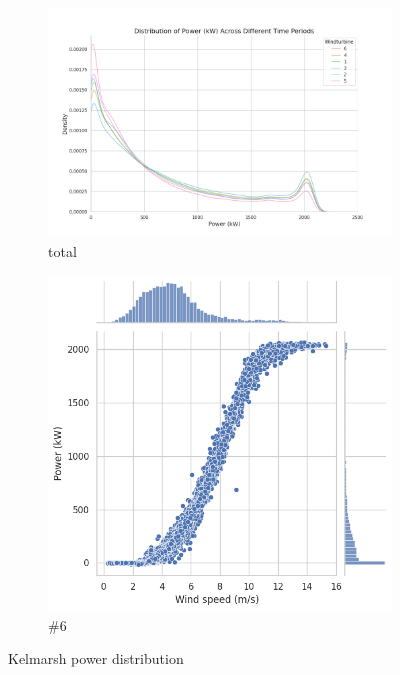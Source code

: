 \documentclass{article}
\begin{document}
\begin{figure}[h!]
    \centering
    \begin{subfigure}[b]{0.45\linewidth}
        \centering
        \includegraphics[width=\linewidth]{graphs/Kelmarsh_output_distribution.png}
        \caption{total}
    \end{subfigure}
    \begin{subfigure}[b]{0.45\linewidth}
        \centering
        \includegraphics[width=\linewidth]{graphs/Corr_Wind_Power.png}
        \caption{\#6}
    \end{subfigure}
    \caption{Kelmarsh power distribution}
    \label{fig:Kelmarsh-distribution}
\end{figure}
\end{document}
